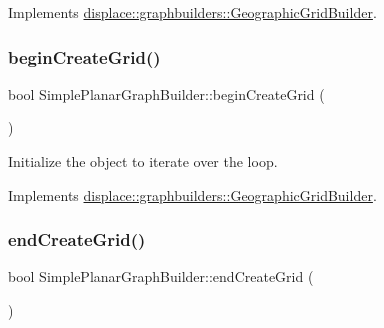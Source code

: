 Implements \mbox{\hyperlink{classdisplace_1_1graphbuilders_1_1_geographic_grid_builder_abf20b262ee44a64508458483d26f42c1}{displace\+::graphbuilders\+::\+Geographic\+Grid\+Builder}}.

\mbox{\label{classdisplace_1_1graphbuilders_1_1_simple_planar_graph_builder_acc34e4093c7e96d705b7269bebf20233}} 
\subsubsection{\texorpdfstring{beginCreateGrid()}{beginCreateGrid()}}
{\footnotesize\ttfamily bool Simple\+Planar\+Graph\+Builder\+::begin\+Create\+Grid (\begin{DoxyParamCaption}{ }\end{DoxyParamCaption})\hspace{0.3cm}{\ttfamily [virtual]}}



Initialize the object to iterate over the loop. 



Implements \mbox{\hyperlink{classdisplace_1_1graphbuilders_1_1_geographic_grid_builder_ac929320efe7bd7c38064250651263999}{displace\+::graphbuilders\+::\+Geographic\+Grid\+Builder}}.

\mbox{\label{classdisplace_1_1graphbuilders_1_1_simple_planar_graph_builder_a829ff92a1bd9dba3170a49ed42b193cc}} 
\subsubsection{\texorpdfstring{endCreateGrid()}{endCreateGrid()}}
{\footnotesize\ttfamily bool Simple\+Planar\+Graph\+Builder\+::end\+Create\+Grid (\begin{DoxyParamCaption}{ }\end{DoxyParamCaption})\hspace{0.3cm}{\ttfamily [virtual]}}




